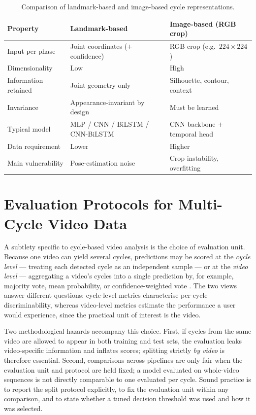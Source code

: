 \begin{table}[htbp]
\centering
\caption{Comparison of landmark-based and image-based cycle representations.}
\label{tab:representations}
\renewcommand{\arraystretch}{1.2}
\begin{tabularx}{\textwidth}{l X X}
\toprule
Property & Landmark-based & Image-based (RGB crop) \\
\midrule
Input per phase & Joint coordinates ($+$ confidence) & RGB crop (e.g.\ $224\times224$) \\
Dimensionality & Low & High \\
Information retained & Joint geometry only & Silhouette, contour, context \\
Invariance & Appearance-invariant by design & Must be learned \\
Typical model & MLP / CNN / BiLSTM / CNN-BiLSTM & CNN backbone $+$ temporal head \\
Data requirement & Lower & Higher \\
Main vulnerability & Pose-estimation noise & Crop instability, overfitting \\
\bottomrule
\end{tabularx}
\end{table}

\section{Evaluation Protocols for Multi-Cycle Video Data}
\label{sec:lit-eval}

A subtlety specific to cycle-based video analysis is the choice of evaluation
unit. Because one video can yield several cycles, predictions may be scored at
the \emph{cycle level} --- treating each detected cycle as an independent sample
--- or at the \emph{video level} --- aggregating a video's cycles into a single
prediction by, for example, majority vote, mean probability, or
confidence-weighted vote \cite{singh2018gaitsurvey}. The two views answer
different questions: cycle-level metrics characterise per-cycle discriminability,
whereas video-level metrics estimate the performance a user would experience,
since the practical unit of interest is the video.

Two methodological hazards accompany this choice. First, if cycles from the same
video are allowed to appear in both training and test sets, the evaluation leaks
video-specific information and inflates scores; splitting strictly \emph{by
video} is therefore essential. Second, comparisons across
pipelines are only fair when the evaluation unit and protocol are held fixed; a
model evaluated on whole-video sequences is not directly comparable to one
evaluated per cycle. Sound practice is to report the split protocol explicitly,
to fix the evaluation unit within any comparison, and to state whether a tuned
decision threshold was used and how it was selected.

